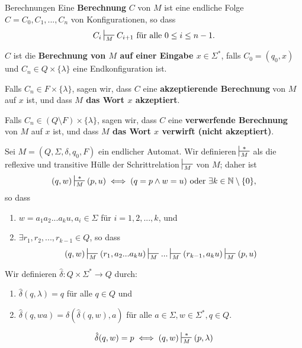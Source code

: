 \begin{mainbox}{Berechnungen}
    Eine \textbf{Berechnung} $C$ von $M$ ist eine endliche Folge $C = C_0, C_1, ..., C_n$ von Konfigurationen, so dass 
    $$C_i \sststile{M}{} C_{i+1} \text{ für alle } 0 \leq i \leq n-1.$$

    $C$ ist die \textbf{Berechnung von $M$ auf einer Eingabe $x \in \Sigma^*$}, falls $C_0 = (q_0, x)$ und $C_n \in Q \times \{\lambda\}$ eine Endkonfiguration ist.
\end{mainbox}
Falls $C_n \in F \times \{\lambda\}$, sagen wir, dass $C$ eine \textbf{akzeptierende Berechnung} von $M$ auf $x$ ist, und dass \textbf{$M$ das Wort $x$ akzeptiert}.

Falls $C_n \in (Q \setminus F) \times \{\lambda\}$, sagen wir, dass $C$ eine \textbf{verwerfende Berechnung} von $M$ auf $x$ ist, und dass \textbf{$M$ das Wort $x$ verwirft (nicht akzeptiert)}.



\begin{mainbox}{}
    Sei $M = (Q, \Sigma, \delta, q_0, F)$ ein endlicher Automat. Wir definieren $\sststile{M}{*}$ als die reflexive und transitive Hülle der Schrittrelation $\sststile{M}{}$ von $M$; daher ist
    $$(q, w) \sststile{M}{*}(p,u) \iff (q = p \land w = u) \text{ oder } \exists k \in \N\setminus\{0\},$$
    so dass 
    \begin{enumerate}[label=(\roman*)]
        \item $w = a_1a_2...a_ku, a_i \in \Sigma$ für $i = 1,2,...,k$, und
        \item $\exists r_1, r_2, ...,r_{k-1}\in Q$, so dass 
        $$(q,w) \sststile{M}{}(r_1, a_2...a_ku) \sststile{M}{}...\sststile{M}{}(r_{k-1},a_ku)\sststile{M}{}(p, u)$$
    \end{enumerate}
\end{mainbox}

\begin{mainbox}{}
    Wir definieren $\hat{\delta}: Q \times \Sigma^* \to Q$ durch:
    \begin{enumerate}[label=(\roman*)]
        \item $\hat{\delta}(q, \lambda) = q$ für alle $q \in Q$ und
        \item $\hat{\delta}(q, wa) = \delta(\hat{\delta}(q,w), a)$ für alle $a \in \Sigma, w \in \Sigma^*, q \in Q$.
    \end{enumerate}
\end{mainbox}
$$\hat{\delta}(q, w) = p \iff (q, w) \sststile{M}{*} (p, \lambda)$$




